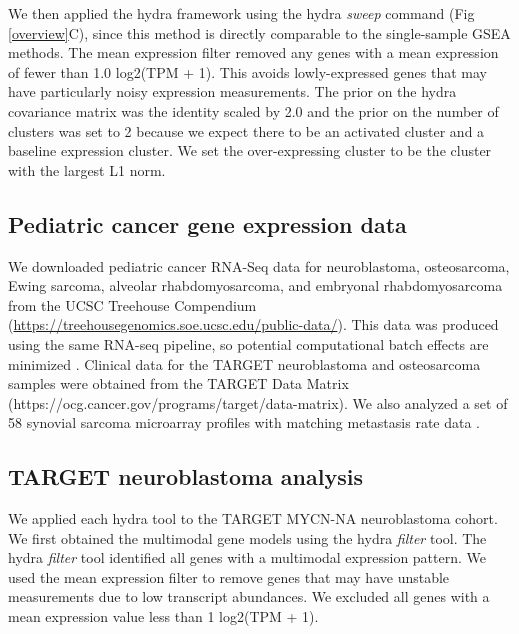 \documentclass[10pt,letterpaper]{article}
\begin{document}
We then applied the hydra framework using the hydra \textit{sweep} command (Fig \ref{overview}C), since this method is directly comparable to the single-sample GSEA methods. The mean expression filter removed any genes with a mean expression of fewer than 1.0 log2(TPM + 1). This avoids lowly-expressed genes that may have particularly noisy expression measurements. The prior on the hydra covariance matrix was the identity scaled by 2.0 and the prior on the number of clusters was set to 2 because we expect there to be an activated cluster and a baseline expression cluster. We set the over-expressing cluster to be the cluster with the largest L1 norm.


\subsection*{Pediatric cancer gene expression data}
We downloaded pediatric cancer RNA-Seq data for neuroblastoma, osteosarcoma, Ewing sarcoma, alveolar rhabdomyosarcoma, and embryonal rhabdomyosarcoma from the UCSC Treehouse Compendium (\url{https://treehousegenomics.soe.ucsc.edu/public-data/}). This data was produced using the same RNA-seq pipeline, so potential computational batch effects are minimized \cite{vivianToilEnablesReproducible2017,vaskeComparativeTumorRNA2019}. Clinical data for the TARGET neuroblastoma and osteosarcoma samples were obtained from the TARGET Data Matrix (https://ocg.cancer.gov/programs/target/data-matrix). We also analyzed a set of 58 synovial sarcoma microarray profiles with matching metastasis rate data \cite{lagardeChromosomeInstabilityAccounts2013}.

\subsection*{TARGET neuroblastoma analysis}
We applied each hydra tool to the TARGET MYCN-NA neuroblastoma cohort. We first obtained the multimodal gene models using the hydra \textit{filter} tool. The hydra \textit{filter} tool identified all genes with a multimodal expression pattern. We used the mean expression filter to remove genes that may have unstable measurements due to low transcript abundances. We excluded all genes with a mean expression value less than 1 log2(TPM + 1).
\end{document}
